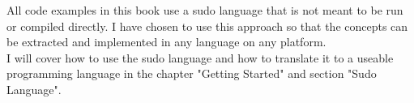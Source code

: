 All code examples in this book use a sudo language that is not meant to be run or compiled directly.
I have chosen to use this approach so that the concepts can be extracted and implemented in any language
on any platform.
\newline
\\
I will cover how to use the sudo language and how to translate it to a useable programming language
in the chapter "Getting Started" and section "Sudo Language".
